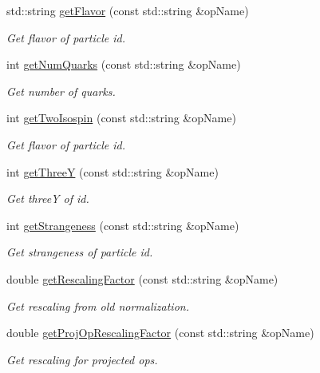 \begin{DoxyCompactItemize}
std\+::string \mbox{\hyperlink{namespaceHadron_adfbec5b7f783df2c9cefec3692adf179}{get\+Flavor}} (const std\+::string \&op\+Name)
\begin{DoxyCompactList}\small\item\em Get flavor of particle id. \end{DoxyCompactList}\item 
int \mbox{\hyperlink{namespaceHadron_a030f1f2fabdb2b0de5421b2a0a15689c}{get\+Num\+Quarks}} (const std\+::string \&op\+Name)
\begin{DoxyCompactList}\small\item\em Get number of quarks. \end{DoxyCompactList}\item 
int \mbox{\hyperlink{namespaceHadron_a28f936e0038f56334a16574038c9aa0b}{get\+Two\+Isospin}} (const std\+::string \&op\+Name)
\begin{DoxyCompactList}\small\item\em Get flavor of particle id. \end{DoxyCompactList}\item 
int \mbox{\hyperlink{namespaceHadron_a8739169b4caffa5f8bab802592b3302a}{get\+ThreeY}} (const std\+::string \&op\+Name)
\begin{DoxyCompactList}\small\item\em Get threeY of id. \end{DoxyCompactList}\item 
int \mbox{\hyperlink{namespaceHadron_adfdd6762b0b73d56c308a674d4c0164d}{get\+Strangeness}} (const std\+::string \&op\+Name)
\begin{DoxyCompactList}\small\item\em Get strangeness of particle id. \end{DoxyCompactList}\item 
double \mbox{\hyperlink{namespaceHadron_abc76a2d893a589ba2a1a346954901854}{get\+Rescaling\+Factor}} (const std\+::string \&op\+Name)
\begin{DoxyCompactList}\small\item\em Get rescaling from old normalization. \end{DoxyCompactList}\item 
double \mbox{\hyperlink{namespaceHadron_aeb564a291631b101c405d7f4257391f8}{get\+Proj\+Op\+Rescaling\+Factor}} (const std\+::string \&op\+Name)
\begin{DoxyCompactList}\small\item\em Get rescaling for projected ops. \end{DoxyCompactList}\item 

\end{DoxyCompactItemize}
